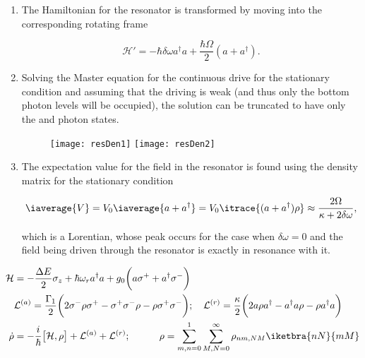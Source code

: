 \begin{enumerate}
\item  The Hamiltonian  for  the  resonator is  transformed  by  moving into  the
  corresponding rotating frame

  \begin{equation}\label{ar4}
    \mathcal{H'} = -\hbar\delta\omega a^{\dagger}a+\frac{\hbar\Omega}{2}(a+a^{\dagger}).
  \end{equation}

\item Solving  the Master equation  for the  continuous drive for  the stationary
  condition  and assuming  that the  driving is  weak (and  thus only  the bottom
  photon levels will be occupied), the solution can be truncated to have only the
   and  photon states.

  \begin{figure}[h]
    \texttt{[image: resDen1]} \texttt{[image: resDen2]}
  \end{figure}

\item The  expectation value for  the field in the  resonator is found  using the
  density matrix for the stationary condition

  \begin{equation}\label{filedRes}
    \iaverage{V} = V_0\iaverage{a+a^{\dagger}} = V_0\itrace{(a+a^{\dagger})\rho}\approx\frac{2\Omega}{\kappa+2\delta\omega},
  \end{equation}

  \noindent  which  is  a  Lorentian,  whose   peak  occurs  for  the  case  when
  $ \delta\omega=0 $ and the field  being driven through the resonator is exactly
  in resonance with it.
\end{enumerate}

\noindent {}

\begin{equation}\label{ar1}
  \begin{aligned}
    \mathcal{H} & ={-\frac{\Delta E}{2}\sigma_z}+{{\hbar\omega_r}a^\dagger a} + {g_0\bigg({a\sigma^+}+{a^{\dagger}\sigma^-}\bigg)}\\
    &\mathcal{L}^{(a)} = \frac{\Gamma_1}{2}\bigg(2\sigma^{-}\rho \sigma^{+}-\sigma^{+}\sigma^{-}\rho-\rho \sigma^{+}\sigma^{-}\bigg);\quad\mathcal{L}^{(r)} = \frac{\kappa}{2}\bigg(2a\rho a^{\dagger}-a^{\dagger}a\rho-\rho a^{\dagger}a\bigg)\\
    \dot{\rho} & = -\frac{i}{\hbar}\big[\mathcal{H},\rho\big]+\mathcal{L}^{(a)}+\mathcal{L}^{(r)};\quad\quad\quad \rho = \sum_{m,n=0}^{1}\sum_{M,N=0}^{\infty}\rho_{nm,NM}\iketbra{nN}{mM}\\
  \end{aligned}
\end{equation}

